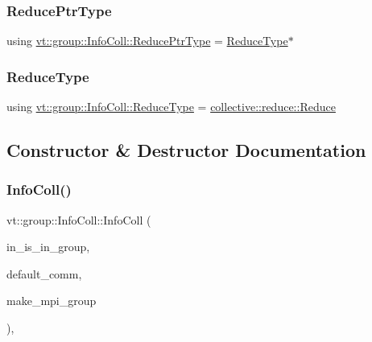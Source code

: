 \mbox{\label{structvt_1_1group_1_1_info_coll_a1b9fe0214f622ed9e8987531f44ef1fa}} 
\subsubsection{\texorpdfstring{Reduce\+Ptr\+Type}{ReducePtrType}}
{\footnotesize\ttfamily using \hyperlink{structvt_1_1group_1_1_info_coll_a1b9fe0214f622ed9e8987531f44ef1fa}{vt\+::group\+::\+Info\+Coll\+::\+Reduce\+Ptr\+Type} =  \hyperlink{structvt_1_1group_1_1_info_coll_a8376e2576e5e40b3c8059122bc96ec1b}{Reduce\+Type}$\ast$}

\mbox{\label{structvt_1_1group_1_1_info_coll_a8376e2576e5e40b3c8059122bc96ec1b}} 
\subsubsection{\texorpdfstring{Reduce\+Type}{ReduceType}}
{\footnotesize\ttfamily using \hyperlink{structvt_1_1group_1_1_info_coll_a8376e2576e5e40b3c8059122bc96ec1b}{vt\+::group\+::\+Info\+Coll\+::\+Reduce\+Type} =  \hyperlink{structvt_1_1collective_1_1reduce_1_1_reduce}{collective\+::reduce\+::\+Reduce}}



\subsection{Constructor \& Destructor Documentation}
\mbox{\label{structvt_1_1group_1_1_info_coll_a1181dfe3d01399d8e903d700461d2d7f}} 
\subsubsection{\texorpdfstring{Info\+Coll()}{InfoColl()}}
{\footnotesize\ttfamily vt\+::group\+::\+Info\+Coll\+::\+Info\+Coll (\begin{DoxyParamCaption}\item[{bool const}]{in\+\_\+is\+\_\+in\+\_\+group,  }\item[{M\+P\+I\+\_\+\+Comm}]{default\+\_\+comm,  }\item[{bool}]{make\+\_\+mpi\+\_\+group }\end{DoxyParamCaption})\hspace{0.3cm}{\ttfamily [inline]}, {\ttfamily [explicit]}}



